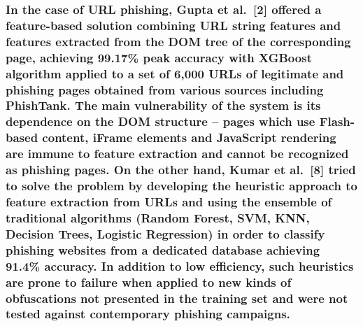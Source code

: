 \subsubsection{In the case of URL phishing, Gupta et al.~{[}2{]} offered
a feature-based solution combining URL string features and features
extracted from the DOM tree of the corresponding page, achieving 99.17\%
peak accuracy with XGBoost algorithm applied to a set of 6,000 URLs of
legitimate and phishing pages obtained from various sources including
PhishTank. The main vulnerability of the system is its dependence on the
DOM structure -- pages which use Flash-based content, iFrame elements
and JavaScript rendering are immune to feature extraction and cannot be
recognized as phishing pages. On the other hand, Kumar et al.~{[}8{]}
tried to solve the problem by developing the heuristic approach to
feature extraction from URLs and using the ensemble of traditional
algorithms (Random Forest, SVM, KNN, Decision Trees, Logistic
Regression) in order to classify phishing websites from a dedicated
database achieving 91.4\% accuracy. In addition to low efficiency, such
heuristics are prone to failure when applied to new kinds of
obfuscations not presented in the training set and were not tested
against contemporary phishing
campaigns.}\label{in-the-case-of-url-phishing-gupta-et-al.-2-offered-a-feature-based-solution-combining-url-string-features-and-features-extracted-from-the-dom-tree-of-the-corresponding-page-achieving-99.17-peak-accuracy-with-xgboost-algorithm-applied-to-a-set-of-6000-urls-of-legitimate-and-phishing-pages-obtained-from-various-sources-including-phishtank.-the-main-vulnerability-of-the-system-is-its-dependence-on-the-dom-structure-pages-which-use-flash-based-content-iframe-elements-and-javascript-rendering-are-immune-to-feature-extraction-and-cannot-be-recognized-as-phishing-pages.-on-the-other-hand-kumar-et-al.-8-tried-to-solve-the-problem-by-developing-the-heuristic-approach-to-feature-extraction-from-urls-and-using-the-ensemble-of-traditional-algorithms-random-forest-svm-knn-decision-trees-logistic-regression-in-order-to-classify-phishing-websites-from-a-dedicated-database-achieving-91.4-accuracy.-in-addition-to-low-efficiency-such-heuristics-are-prone-to-failure-when-applied-to-new-kinds-of-obfuscations-not-presented-in-the-training-set-and-were-not-tested-against-contemporary-phishing-campaigns.}

